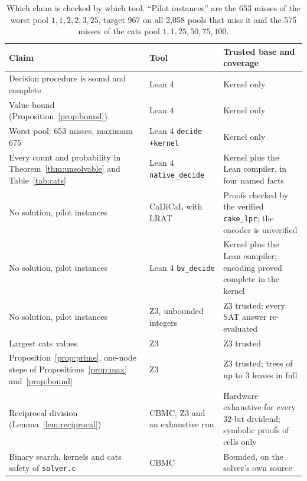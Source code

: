 \documentclass[11pt,a4paper]{article}
\theoremstyle{definition}
\theoremstyle{remark}
\begin{document}
\begin{table}[ht]
\centering
\small
\begin{tabular}{@{}>{\raggedright\arraybackslash}p{4.6cm}>{\raggedright\arraybackslash}p{4.2cm}>{\raggedright\arraybackslash}p{5.4cm}@{}}
\toprule
Claim & Tool & Trusted base and coverage \\ \midrule
Decision procedure is sound and complete & Lean 4 & Kernel only \\
Value bound (Proposition~\ref{prop:bound}) & Lean 4 & Kernel only \\
Worst pool: 653 misses, maximum 675 & Lean 4 \texttt{decide +kernel} & Kernel only \\
Every count and probability in Theorem~\ref{thm:unsolvable} and Table~\ref{tab:cats} & Lean 4 \texttt{native\_decide} & Kernel plus the Lean compiler, in four named facts \\
No solution, pilot instances & CaDiCaL with LRAT & Proofs checked by the verified \texttt{cake\_lpr}; the encoder is unverified \\
No solution, pilot instances & Lean 4 \texttt{bv\_decide} & Kernel plus the Lean compiler; encoding proved complete in the kernel \\
No solution, pilot instances & Z3, unbounded integers & Z3 trusted; every SAT answer re-evaluated \\
Largest cats values & Z3 & Z3 trusted \\
Proposition~\ref{prop:prime}, one-node steps of Propositions~\ref{prop:max} and~\ref{prop:bound} & Z3 & Z3 trusted; trees of up to 3 leaves in full \\
Reciprocal division (Lemma~\ref{lem:reciprocal}) & CBMC, Z3 and an exhaustive run & Hardware exhaustive for every 32-bit dividend; symbolic proofs of cells only \\
Binary search, kernels and cats safety of \texttt{solver.c} & CBMC & Bounded, on the solver's own source \\ \bottomrule
\end{tabular}
\caption{Which claim is checked by which tool. ``Pilot instances'' are the 653 misses of the worst pool
$1, 1, 2, 2, 3, 25$, target 967 on all 2{,}058 pools that miss it and the 575 misses of the cats pool
$1, 1, 25, 50, 75, 100$.}
\label{tab:checked}
\end{table}
\end{document}
